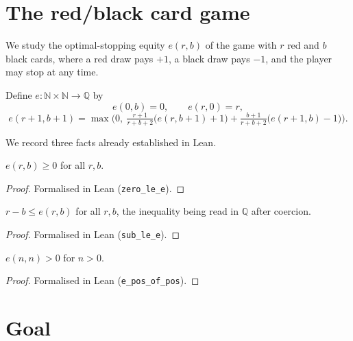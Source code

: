 
\section{The red/black card game}

We study the optimal-stopping equity $e(r,b)$ of the game with $r$ red and $b$
black cards, where a red draw pays $+1$, a black draw pays $-1$, and the player
may stop at any time.

\begin{definition}[Equity]\label{def:e}
\leanok
Define $e:\mathbb N\times\mathbb N\to\mathbb Q$ by
\[
  e(0,b)=0,\qquad e(r,0)=r,
\]
\[
  e(r+1,b+1)=\max\!\Big(0,\ \tfrac{r+1}{r+b+2}\big(e(r,b+1)+1\big)
                          +\tfrac{b+1}{r+b+2}\big(e(r+1,b)-1\big)\Big).
\]
\end{definition}

We record three facts already established in Lean.

\begin{lemma}[Nonnegativity]\label{lem:zero_le_e}
 \leanok
{}
$e(r,b)\ge 0$ for all $r,b$.
\end{lemma}
\begin{proof}\leanok
Formalised in Lean (\texttt{zero\_le\_e}).
\end{proof}

\begin{lemma}\label{lem:sub_le_e}
\leanok
{}
$r-b\le e(r,b)$ for all $r,b$, the inequality being read in $\mathbb Q$ after
coercion.
\end{lemma}
\begin{proof}\leanok
Formalised in Lean (\texttt{sub\_le\_e}).
\end{proof}

\begin{lemma}\label{lem:e_pos}
\leanok
{}
$e(n,n)>0$ for $n>0$.
\end{lemma}
\begin{proof}\leanok
Formalised in Lean (\texttt{e\_pos\_of\_pos}).
\end{proof}

\section{Goal}

